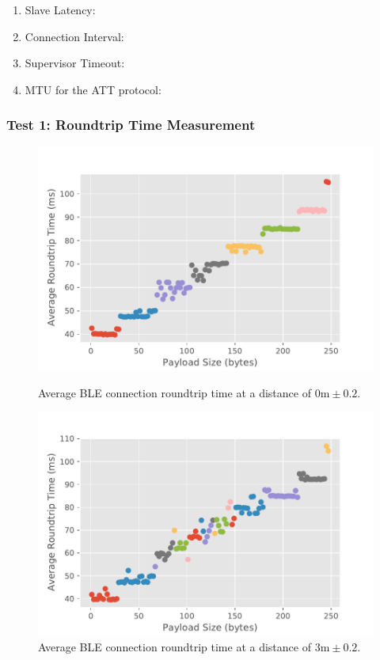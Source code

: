 \begin{enumerate}
    \item Slave Latency:
    \item Connection Interval:
    \item Supervisor Timeout:
    \item \acf{MTU} for the \acs{ATT} protocol: 
\end{enumerate}

\subsubsection{Test 1: Roundtrip Time Measurement}

\begin{figure}[H]
    \begin{minipage}[r]{0.49\linewidth}
    \centering
    \includegraphics[width=\linewidth]{images/ble-roundtrip-hci0-0cm.pdf}
    \caption[Average \acs{BLE} connection roundtrip time at a distance of 0m.]{Average \acs{BLE} connection roundtrip time at a distance of $0\text{m} \pm 0.2$.}
    \label{fig:ble-roundtrip-0cm}
    \end{minipage}
    \begin{minipage}[l]{0.49\linewidth}
        \centering
        \includegraphics[width=\linewidth]{images/ble-roundtrip-hci0-300cm.pdf}
        \caption[Average \acs{BLE} connection roundtrip time at a distance of 3m.]{Average \acs{BLE} connection roundtrip time at a distance of $3\text{m} \pm 0.2$.}
        \label{fig:ble-roundtrip-3cm}
        \end{minipage}
\end{figure}
